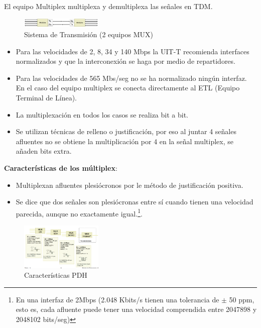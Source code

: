 \documentclass[10pt,portrait, twocolumn]{article}
\begin{document}
El equipo Multiplex multiplexa y demultiplexa las señales en TDM. 
  
 \begin{figure}[ht]
	\centering
     \includegraphics[width=0.35\textwidth]{SdT}
      \caption{Sistema de Transmisión (2 equipos MUX)}
      \label{fig:Regiones de frecuencias}
  \end{figure}
  
  \begin{itemize}
  \item Para las velocidades de 2, 8, 34 y 140 Mbps la UIT-T recomienda interfaces normalizados y que la interconexión se haga por medio de repartidores.
  \item  Para las velocidades de 565 Mbs/seg no se ha normalizado ningún interfaz. En el caso del equipo multiplex se conecta directamente al ETL (Equipo Terminal de Línea). 
  \item La multiplexación en todos los casos se realiza bit a bit.
  \item Se utilizan técnicas de relleno o justificación, por eso al juntar 4 señales afluentes no se obtiene la multiplicación por 4 en la señal multiplex, se añaden bits extra.\\
  \end{itemize}

\textbf{Características de los múltiplex}: 

\begin{itemize}
\item Multiplexan afluentes plesiócronos por le método de justificación positiva.
\item  Se dice que dos señales son plesiócronas entre sí cuando tienen una velocidad parecida, aunque no exactamente igual.\footnote{En una interfaz de 2Mbps (2.048 Kbits/s tienen una tolerancia de $\pm$ 50 ppm, esto es, cada afluente puede tener una velocidad comprendida entre 2047898 y 2048102 bits/seg)}.
\end{itemize}



\begin{figure}[h]
	\centering
     \includegraphics[width=0.35\textwidth]{CaracPDH}
      \caption{Características PDH}
      \label{fig:Regiones de frecuencias}
  \end{figure}
  
\end{document}
